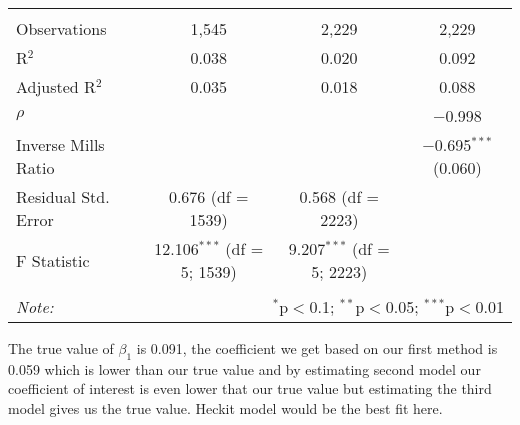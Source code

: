 \documentclass{article}
\begin{document}
\begin{table}[!htbp]
\begin{tabular}{@{\extracolsep{5pt}}lccc}
  & & & \\ 
\hline \\[-1.8ex] 
Observations & 1,545 & 2,229 & 2,229 \\ 
R$^{2}$ & 0.038 & 0.020 & 0.092 \\ 
Adjusted R$^{2}$ & 0.035 & 0.018 & 0.088 \\ 
$\rho$ &  &  & $-$0.998 \\ 
Inverse Mills Ratio &  &  & $-$0.695$^{***}$  (0.060) \\ 
Residual Std. Error & 0.676 (df = 1539) & 0.568 (df = 2223) &  \\ 
F Statistic & 12.106$^{***}$ (df = 5; 1539) & 9.207$^{***}$ (df = 5; 2223) &  \\ 
\hline 
\hline \\[-1.8ex] 
\textit{Note:}  & \multicolumn{3}{r}{$^{*}$p$<$0.1; $^{**}$p$<$0.05; $^{***}$p$<$0.01} \\ 
\end{tabular} 
\end{table} 


The true value of $\beta_1$ is 0.091, the coefficient we get based on our first method is 0.059 which is lower than our true value and by estimating second model our coefficient of interest is even lower that our true value but estimating the third model gives us the true value. Heckit model would be the best fit here.
\end{document}
